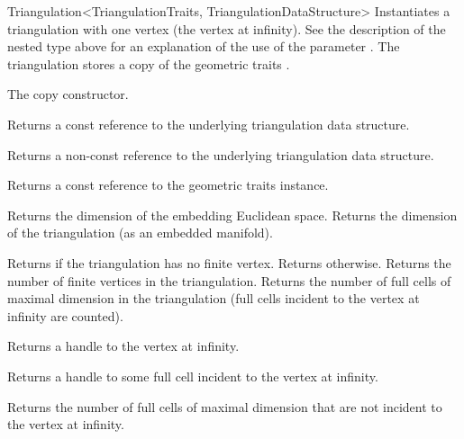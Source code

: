 \begin{ccRefClass}{Triangulation<TriangulationTraits, TriangulationDataStructure>}
{Instantiates a triangulation with one vertex (the vertex at infinity). See the
description of the nested type  above for an
explanation of the use of the parameter . The triangulation stores a copy
of the geometric traits .}

{The copy constructor.}%



%
{Returns a const reference to the underlying triangulation data structure.}

\begin{ccAdvanced}
%
{Returns a non-const 
reference to the underlying triangulation data structure.}
\end{ccAdvanced}

%
{Returns a const reference to the geometric traits instance.}

%
{Returns the dimension of the embedding Euclidean space.}
\ccGlue
{}%
{Returns the dimension of the triangulation (as an embedded manifold).}

%
{Returns  if the triangulation has no finite vertex. Returns
 otherwise.}
\ccGlue
{}%
{Returns the number of finite vertices in the triangulation.}
\ccGlue
{}%
{Returns the number of full cells of maximal dimension in the triangulation
(full cells incident to the vertex at infinity are counted).}

%
{Returns a handle to the vertex at infinity.}

%
{Returns a handle to some full cell incident to the vertex at infinity.}


%
{Returns the number of full cells of maximal dimension that are not
  incident to the vertex at infinity.}


\end{ccRefClass}
